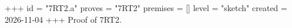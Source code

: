 +++
id = "7RT2.a"
proves = "7RT2"
premises = []
level = "sketch"
created = 2026-11-04
+++
Proof of 7RT2.
